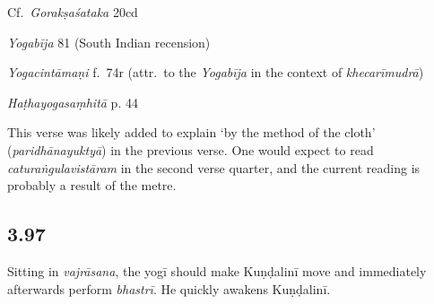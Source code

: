 \begin{ekdosis}
\begin{sources}[hp03_096_2]
Cf.~\emph{Gorakṣaśataka} 20cd
\begin{versinnote}
\end{versinnote}
\end{sources}

\begin{testimonia}[hp03_096_2]
\emph{Yogabīja} 81 (South Indian recension)
\begin{versinnote}
\end{versinnote}

\emph{Yogacintāmaṇi} f.~74r (attr.~to the \emph{Yogabīja} in the context of \emph{khecarīmudrā})
\begin{versinnote}
\end{versinnote}

\emph{Haṭhayogasaṃhitā} p. 44
\begin{versinnote}
\end{versinnote}
\end{testimonia}

\begin{philcomm}[hp03_096_2]
This verse was likely added to explain `by the method of the cloth' (\emph{paridhānayuktyā}) in the previous verse. One would expect to read \emph{caturaṅgulavistāram} in the second verse quarter, and the current reading is probably a result of the metre.
\end{philcomm}


\subsection*{3.97}
\begin{translation}[hp03_097]
Sitting in \emph{vajrāsana}, the yogī should make Kuṇḍalinī move and immediately afterwards perform \emph{bhastrī}. He quickly awakens Kuṇḍalinī.
\end{translation}


\end{ekdosis}
